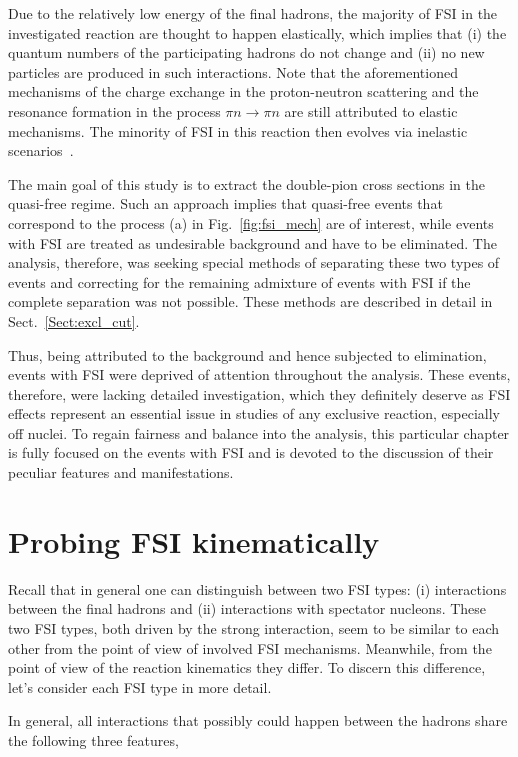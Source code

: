 Due to the relatively low energy of the final hadrons, the majority of FSI in the investigated reaction are thought to happen elastically, which implies that (i) the quantum numbers of the participating hadrons do not change and (ii) no new particles are produced in such interactions. Note that the aforementioned mechanisms of the charge exchange in the proton-neutron scattering and the resonance formation in the process $\pi n \rightarrow \pi n$ are still attributed to elastic mechanisms. The minority of FSI in this reaction then evolves via inelastic scenarios~\cite{Shirokov_Yudin:1980}.  


The main goal of this study is to extract the double-pion cross sections in the quasi-free regime. Such an approach implies that quasi-free events that correspond to the process (a) in Fig.~\ref{fig:fsi_mech} are of interest, while events with FSI are treated as undesirable background and have to be eliminated. The analysis, therefore, was seeking special methods of separating these two types of events and correcting for the remaining admixture of events with FSI if the complete separation was not possible. These methods are described in detail in Sect.~\ref{Sect:excl_cut}.


Thus, being attributed to the background and hence subjected to elimination, events with FSI were deprived of attention throughout the analysis. These events, therefore, were lacking detailed investigation, which they definitely deserve as FSI effects represent an essential issue in studies of any exclusive reaction, especially off nuclei. To regain fairness and balance into the analysis, this particular chapter is fully focused on the events with FSI and is devoted to the discussion of their peculiar features and manifestations. 


\section{Probing FSI kinematically}

Recall that in general one can distinguish between two FSI types: (i) interactions between the final hadrons and (ii) interactions with spectator nucleons. These two FSI types, both driven by the strong interaction, seem to be similar to each other from the point of view of involved FSI mechanisms. Meanwhile, from the point of view of the reaction kinematics they differ. To discern this difference, let's consider each FSI type in more detail.


In general, all interactions that possibly could happen between the hadrons share the following three features,

